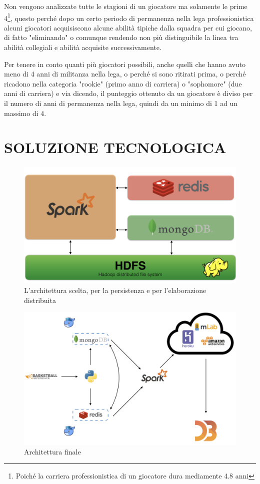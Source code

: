 \documentclass[10.5pt,a4paper,twocolumn]{article}
\begin{document}
Non vengono analizzate tutte le stagioni di un giocatore ma solamente le prime 4\footnote{Poiché la carriera professionistica di un giocatore dura mediamente 4.8 anni}, questo perché dopo un certo periodo di permanenza nella lega professionistica alcuni giocatori acquisiscono alcune abilità tipiche dalla squadra per cui giocano, di fatto "eliminando" o comunque rendendo non più distinguibile la linea tra abilità collegiali e abilità acquisite successivamente.

Per tenere in conto quanti più giocatori possibili, anche quelli che hanno avuto meno di 4 anni di militanza nella lega, o perché si sono ritirati prima, o perché ricadono nella categoria "rookie" (primo anno di carriera) o "sophomore" (due anni di carriera) e via dicendo, il punteggio ottenuto da un giocatore è diviso per il numero di anni di permanenza nella lega, quindi da un minimo di 1 ad un massimo di 4.

\section{SOLUZIONE TECNOLOGICA}

\begin{figure}[h]
	\centering
	\includegraphics[width=\linewidth]{arch}
	\caption{L'architettura scelta, per la persistenza e per l'elaborazione distribuita}
	\label{fig:arch}
\end{figure}

\begin{figure}[h]
	\centering
	\includegraphics[width=0.8\linewidth]{final}
	\caption{Architettura finale}
	\label{fig:finale}
\end{figure}
\end{document}
